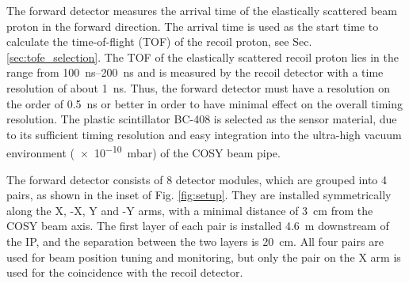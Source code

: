 \documentclass[number,5p]{elsarticle}
\begin{document}
The forward detector measures the arrival time of the elastically scattered beam proton in the
forward direction.
The arrival time is used as the start time to calculate the time-of-flight (TOF)
of the recoil proton, see Sec. \ref{sec:tofe_selection}.
The TOF of the elastically scattered recoil proton lies in the range from
\SIrange{100}{200}{\ns} and is measured by the recoil detector with a time resolution of about \SI{1}{\ns}.
Thus, the forward detector must have a resolution on the order of \SI{0.5}{\ns} or better in order to have minimal effect on the overall timing resolution.
The plastic scintillator BC-408 \cite{bc408} is selected as the sensor material, due to its sufficient timing resolution and
easy integration into the ultra-high vacuum environment (\SI{e-10}{\milli\bar}) of the COSY beam pipe.

The forward detector consists of 8 detector modules, which are
grouped into 4 pairs, as shown in the inset of Fig. \ref{fig:setup}.
They are installed symmetrically along the X, -X, Y and -Y arms, with a
minimal distance of \SI{3}{\cm} from the COSY beam axis.
The first layer of each pair is installed \SI{4.6}{\meter} downstream of the IP, and the separation between the two layers is \SI{20}{\cm}.
All four pairs are used for beam position tuning and monitoring, but only the
pair on the X arm is used for the coincidence with the recoil detector.
\end{document}
